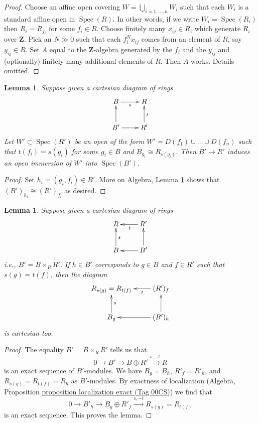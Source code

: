 \documentclass{amsart}
\theoremstyle{plain}
\newtheorem{lemma}[subsection]{Lemma}
\theoremstyle{definition}
\theoremstyle{remark}
\numberwithin{equation}{subsection}
\def\Spec{\mathop{\mathrm{Spec}}}
\begin{document}
\begin{proof}
Choose an affine open covering $W = \bigcup_{i = 1, \ldots, n} W_i$
such that each $W_i$ is a standard affine open in $\Spec(R)$.
In other words, if we write $W_i = \Spec(R_i)$
then $R_i = R_{f_i}$ for some $f_i \in R$.
Choose finitely many $x_{ij} \in R_i$ which generate
$R_i$ over $\mathbf{Z}$.
Pick an $N \gg 0$ such that each $f_i^Nx_{ij}$ comes from an
element of $R$, say $y_{ij} \in R$.
Set $A$ equal to the $\mathbf{Z}$-algebra generated by
the $f_i$ and the $y_{ij}$ and (optionally) finitely many
additional elements of $R$. Then $A$ works. Details omitted.
\end{proof}


\begin{lemma}
\label{limits-lemma-diagram}
Suppose given a cartesian diagram of rings
$$
\xymatrix{
B \ar[r]_s & R \\
B'\ar[u] \ar[r] & R' \ar[u]_t
}
$$
Let $W' \subset \Spec(R')$ be an open of
the form $W' = D(f_1) \cup \ldots \cup D(f_n)$
such that $t(f_i) = s(g_i)$ for some $g_i \in B$
and $B_{g_i} \cong R_{s(g_i)}$. Then $B' \to R'$
induces an open immersion of $W'$ into $\Spec(B')$.
\end{lemma}

\begin{proof}
Set $h_i = (g_i, f_i) \in B'$. More on Algebra,
Lemma \ref{more-algebra-lemma-diagram-localize} shows that
$(B')_{h_i} \cong (R')_{f_i}$ as desired.
\end{proof}


\begin{lemma}
\label{more-algebra-lemma-diagram-localize}
Suppose given a cartesian diagram of rings
$$
\xymatrix{
R &
R' \ar[l]^t \\
B \ar[u]_s &
B'\ar[u] \ar[l]
}
$$
i.e., $B' = B \times_R R'$. If $h \in B'$ corresponds to $g \in B$
and $f \in R'$ such that $s(g) = t(f)$, then the diagram
$$
\xymatrix{
R_{s(g)} = R_{t(f)} &
(R')_f \ar[l]^-t \\
B_g \ar[u]_s &
(B')_h \ar[u] \ar[l]
}
$$
is cartesian too.
\end{lemma}

\begin{proof}
The equality $B' = B \times_R R'$ tells us that
$$
0 \to B' \to B \oplus R' \xrightarrow{s, -t} R
$$
is an exact sequence of $B'$-modules. We have $B_g = B_h$,
$R'_f = R'_h$, and $R_{s(g)} = R_{t(f)} = R_h$ as $B'$-modules.
By exactness of localization
(Algebra, Proposition \href{https://stacks.math.columbia.edu/tag/00CS}{proposition localization exact (Tag 00CS)})
we find that
$$
0 \to B'_h \to B_g \oplus R'_f \xrightarrow{s, -t} R_{s(g)} = R_{t(f)}
$$
is an exact sequence. This proves the lemma.
\end{proof}
\end{document}
